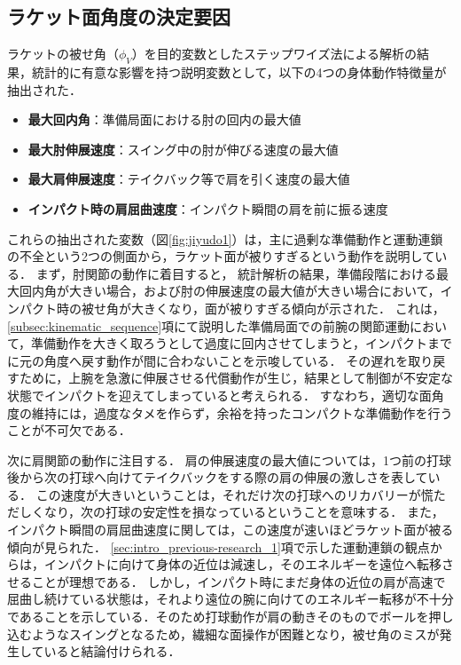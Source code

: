 \documentclass[../main]{subfiles}
\begin{document}
\subsection{ラケット面角度の決定要因}

ラケットの被せ角（$\phi_{V}$）を目的変数としたステップワイズ法による解析の結果，統計的に有意な影響を持つ説明変数として，以下の4つの身体動作特徴量が抽出された．

\begin{itemize}
    \item \textbf{最大回内角}：準備局面における肘の回内の最大値
    \item \textbf{最大肘伸展速度}：スイング中の肘が伸びる速度の最大値
    \item \textbf{最大肩伸展速度}：テイクバック等で肩を引く速度の最大値
    \item \textbf{インパクト時の肩屈曲速度}：インパクト瞬間の肩を前に振る速度
\end{itemize}
これらの抽出された変数（図\ref{fig:jiyudo1}）は，主に過剰な準備動作と運動連鎖の不全という2つの側面から，ラケット面が被りすぎるという動作を説明している．
まず，肘関節の動作に着目すると，
統計解析の結果，準備段階における最大回内角が大きい場合，および肘の伸展速度の最大値が大きい場合において，インパクト時の被せ角が大きくなり，面が被りすぎる傾向が示された．
これは，\ref{subsec:kinematic_sequence}項にて説明した準備局面での前腕の関節運動において，準備動作を大きく取ろうとして過度に回内させてしまうと，インパクトまでに元の角度へ戻す動作が間に合わないことを示唆している．
その遅れを取り戻すために，上腕を急激に伸展させる代償動作が生じ，結果として制御が不安定な状態でインパクトを迎えてしまっていると考えられる．
すなわち，適切な面角度の維持には，過度なタメを作らず，余裕を持ったコンパクトな準備動作を行うことが不可欠である．


次に肩関節の動作に注目する．
肩の伸展速度の最大値については，1つ前の打球後から次の打球へ向けてテイクバックをする際の肩の伸展の激しさを表している．
この速度が大きいということは，それだけ次の打球へのリカバリーが慌ただしくなり，次の打球の安定性を損なっているということを意味する．
また，インパクト瞬間の肩屈曲速度に関しては，この速度が速いほどラケット面が被る傾向が見られた．
\ref{sec:intro_previous-research_1}項で示した運動連鎖の観点からは，インパクトに向けて身体の近位は減速し，そのエネルギーを遠位へ転移させることが理想である．
しかし，インパクト時にまだ身体の近位の肩が高速で屈曲し続けている状態は，それより遠位の腕に向けてのエネルギー転移が不十分であることを示している．そのため打球動作が肩の動きそのものでボールを押し込むようなスイングとなるため，繊細な面操作が困難となり，被せ角のミスが発生していると結論付けられる．
\end{document}
